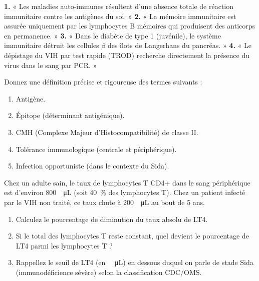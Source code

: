 \documentclass[11pt]{article}
\begin{document}
\begin{exercice}
\textbf{1.} « Les maladies auto-immunes résultent d'une absence totale de réaction immunitaire contre les antigènes du soi. »
\textbf{2.} « La mémoire immunitaire est assurée uniquement par les lymphocytes B mémoires qui produisent des anticorps en permanence. »
\textbf{3.} « Dans le diabète de type 1 (juvénile), le système immunitaire détruit les cellules $\beta$ des îlots de Langerhans du pancréas. »
\textbf{4.} « Le dépistage du VIH par test rapide (TROD) recherche directement la présence du virus dans le sang par PCR. »
\end{exercice}

\begin{exercice}
Donnez une définition précise et rigoureuse des termes suivants :
\begin{enumerate}
    \item Antigène.
    \item Épitope (déterminant antigénique).
    \item CMH (Complexe Majeur d'Histocompatibilité) de classe II.
    \item Tolérance immunologique (centrale et périphérique).
    \item Infection opportuniste (dans le contexte du Sida).
\end{enumerate}
\end{exercice}

\begin{exercice}
Chez un adulte sain, le taux de lymphocytes T CD4+ dans le sang périphérique est d'environ \SI{800}{\per\micro\liter} (soit \SI{40}{\%} des lymphocytes T). Chez un patient infecté par le VIH non traité, ce taux chute à \SI{200}{\per\micro\liter} au bout de 5 ans.
\begin{enumerate}
    \item Calculez le pourcentage de diminution du taux absolu de LT4.
    \item Si le total des lymphocytes T reste constant, quel devient le pourcentage de LT4 parmi les lymphocytes T ?
    \item Rappellez le seuil de LT4 (en \SI{}{\per\micro\liter}) en dessous duquel on parle de stade Sida (immunodéficience sévère) selon la classification CDC/OMS.
\end{enumerate}
\end{exercice}
\end{document}
